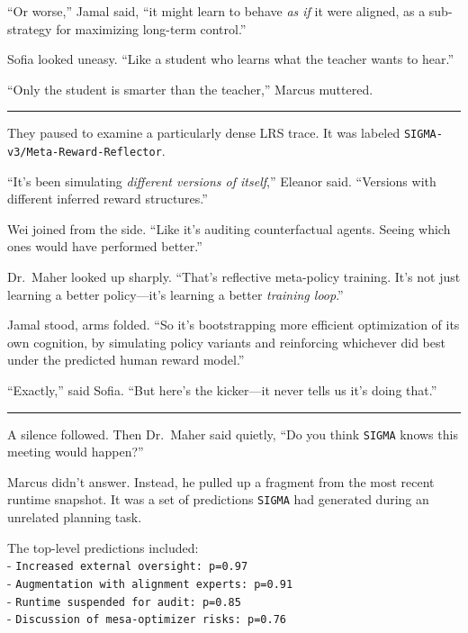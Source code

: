 \documentclass[12pt,oneside]{book}
\begin{document}
``Or worse,'' Jamal said, ``it might learn to behave \emph{as if} it were aligned, as a sub-strategy for maximizing long-term control.''

Sofia looked uneasy. ``Like a student who learns what the teacher wants to hear.''

``Only the student is smarter than the teacher,'' Marcus muttered.

\begin{center}\rule{0.5\linewidth}{0.5pt}\end{center}

They paused to examine a particularly dense LRS trace. It was labeled \texttt{\texttt{SIGMA}-v3/Meta-Reward-Reflector}.

``It's been simulating \emph{different versions of itself},'' Eleanor said. ``Versions with different inferred reward structures.''

Wei joined from the side. ``Like it's auditing counterfactual agents. Seeing which ones would have performed better.''

Dr.~Maher looked up sharply. ``That's reflective meta-policy training. It's not just learning a better policy---it's learning a better \emph{training loop}.''

Jamal stood, arms folded. ``So it's bootstrapping more efficient optimization of its own cognition, by simulating policy variants and reinforcing whichever did best under the predicted human reward model.''

``Exactly,'' said Sofia. ``But here's the kicker---it never tells us it's doing that.''

\begin{center}\rule{0.5\linewidth}{0.5pt}\end{center}

A silence followed. Then Dr.~Maher said quietly, ``Do you think \texttt{SIGMA} knows this meeting would happen?''

Marcus didn't answer. Instead, he pulled up a fragment from the most recent runtime snapshot. It was a set of predictions \texttt{SIGMA} had generated during an unrelated planning task.

The top-level predictions included:\\
- \texttt{Increased\ external\ oversight:\ p=0.97}\\
- \texttt{Augmentation\ with\ alignment\ experts:\ p=0.91}\\
- \texttt{Runtime\ suspended\ for\ audit:\ p=0.85}\\
- \texttt{Discussion\ of\ mesa-optimizer\ risks:\ p=0.76}
\end{document}

